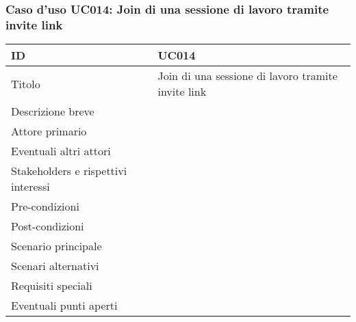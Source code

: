 \documentclass[../../main.tex]{subfiles}
\begin{document}
\subsubsection{Caso d’uso UC014: Join di una sessione di lavoro tramite invite link }
\begin{tabularx}{150mm}{|l|X|}
    \hline
    ID                                  & \textbf{UC014}\\
    \hline
    Titolo                              & Join di una sessione di lavoro tramite invite link \\
    \hline
    Descrizione breve                   &    \\
    \hline
    Attore primario                     &    \\
    \hline
    Eventuali altri attori              &    \\
    \hline
    Stakeholders e rispettivi interessi &    \\
    \hline
    Pre-condizioni                      &    \\
    \hline
    Post-condizioni                     &    \\
    \hline
    Scenario principale                 &    \\
    \hline
    Scenari alternativi                 &    \\
    \hline
    Requisiti speciali                  &    \\
    \hline
    Eventuali punti aperti              &    \\
    \hline
\end{tabularx}
\newpage
\end{document}
